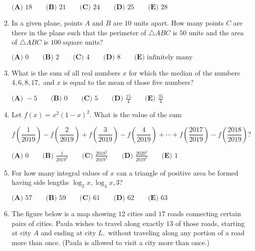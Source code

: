 \documentclass{article}
\begin{document}
\begin{enumerate}[label=\arabic*., itemsep=0.5em]
\(\textbf{(A) } 18 \qquad \textbf{(B) } 21 \qquad \textbf{(C) } 24\qquad \textbf{(D) } 25 \qquad \textbf{(E) } 28\)\par \vspace{0.5em}\item In a given plane, points \(A\) and \(B\) are \(10\) units apart. How many points \(C\) are there in the plane such that the perimeter of \(\triangle ABC\) is \(50\) units and the area of \(\triangle ABC\) is \(100\) square units?

\(\textbf{(A) }0\qquad\textbf{(B) }2\qquad\textbf{(C) }4\qquad\textbf{(D) }8\qquad\textbf{(E) }\text{infinitely many}\)\par \vspace{0.5em}\item What is the sum of all real numbers \(x\) for which the median of the numbers \(4,6,8,17,\) and \(x\) is equal to the mean of those five numbers?

\(\textbf{(A) } -5 \qquad\textbf{(B) } 0 \qquad\textbf{(C) } 5 \qquad\textbf{(D) } \frac{15}{4} \qquad\textbf{(E) } \frac{35}{4}\)\par \vspace{0.5em}\item Let \(f(x) = x^{2}(1-x)^{2}\). What is the value of the sum


\begin{equation*}
f \left(\frac{1}{2019} \right)-f  \left(\frac{2}{2019} \right)+f \left(\frac{3}{2019} \right)-f \left(\frac{4}{2019} \right)+\cdots + f \left(\frac{2017}{2019} \right) - f \left(\frac{2018}{2019} \right)?
\end{equation*}


\(\textbf{(A) }0\qquad\textbf{(B) }\frac{1}{2019^{4}}\qquad\textbf{(C) }\frac{2018^{2}}{2019^{4}}\qquad\textbf{(D) }\frac{2020^{2}}{2019^{4}}\qquad\textbf{(E) }1\)\par \vspace{0.5em}\item For how many integral values of \(x\) can a triangle of positive area be formed having side lengths \(
\log_{2} x, \log_{4} x, 3\)?

\(\textbf{(A) } 57\qquad \textbf{(B) } 59\qquad \textbf{(C) } 61\qquad \textbf{(D) } 62\qquad \textbf{(E) } 63\)\par \vspace{0.5em}\item The figure below is a map showing \(12\) cities and \(17\) roads connecting certain pairs of cities. Paula wishes to travel along exactly \(13\) of those roads, starting at city \(A\) and ending at city \(L,\) without traveling along any portion of a road more than once. (Paula is allowed to visit a city more than once.)



\end{enumerate}
\end{document}

